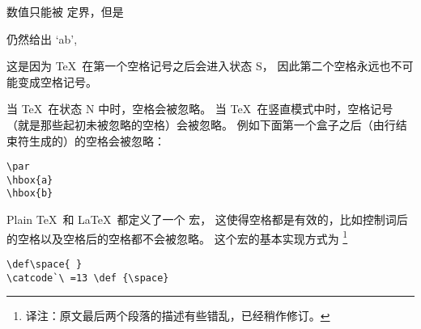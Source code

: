 \documentclass{book}
\begin{document}
数值只能被  定界，但是
\begin{disp}\quad 仍然给出 \quad `ab',\end{disp}
这是因为 \TeX\ 在第一个空格记号之后会进入状态 {\italic S}，
因此第二个空格永远也不可能变成空格记号。

当 \TeX\ 在状态 {\italic N} 中时，空格会被忽略。
当 \TeX\ 在竖直模式中时，空格记号（就是那些起初未被忽略的空格）会被忽略。
例如下面第一个盒子之后（由行结束符生成的）的空格会被忽略：
\begin{verbatim}
\par
\hbox{a}
\hbox{b}
\end{verbatim}

Plain \TeX\ 和 \LaTeX\ 都定义了一个  宏，
这使得空格都是有效的，比如控制词后的空格以及空格后的空格都不会被忽略。
这个宏的基本实现方式为
\footnote{译注：原文最后两个段落的描述有些错乱，已经稍作修订。}
\begin{verbatim}
\def\space{ }
\catcode`\ =13 \def {\space}
\end{verbatim}
\end{document}
